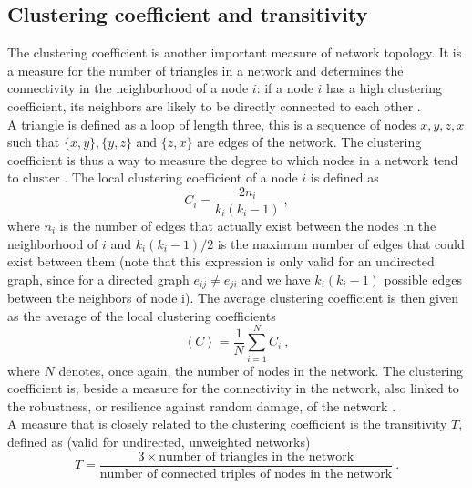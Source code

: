 \documentclass[11 pt , letterpaper , twoside , openright]{book}
\begin{document}
\subsection{Clustering coefficient and transitivity}

The clustering coefficient is another important measure of network topology. It is a measure for the number of triangles in a network and determines the connectivity in the neighborhood of a node $i$: if a node $i$ has a high clustering coefficient, its neighbors are likely to be directly connected to each other \cite{Li2017}. \\
\newline
A triangle is defined as a loop of length three, this is a sequence of nodes $x, y, z, x$ such that $\{x, y\}, \{y, z\}$ and $\{z, x\}$ are edges of the network. The clustering coefficient is thus a way to measure the degree to which nodes in a network tend to cluster \cite{Li2017}. The local clustering coefficient of a node $i$ is defined as
\begin{equation}\label{clus}
	C_i = \frac{2n_i}{k_i(k_i-1)} \ ,
\end{equation}
where $n_i$ is the number of edges that actually exist between the nodes in the neighborhood of $i$ and $k_i(k_i-1)/2$ is the maximum number of edges that could exist between them (note that this expression is only valid for an undirected graph, since for a directed graph $e_{ij} \neq e_{ji}$ and we have $k_i(k_i-1)$ possible edges between the neighbors of node i). %
The average clustering coefficient is then given as the average of the local clustering coefficients
\begin{equation}\label{avClus}
	\left<C\right> = \frac{1}{N}\sum_{i = 1}^N C_i \ ,
\end{equation}
where $N$ denotes, once again, the number of nodes in the network. The clustering coefficient is, beside a measure for the connectivity in the network, also linked to the robustness, or resilience against random damage,  of the network \cite{Heer2020}\cite{Iyer2013} \cite{Li2017}. \\
\newline
A measure that is closely related to the clustering coefficient is the transitivity $T$, defined as (valid for undirected, unweighted networks) \cite{F.Costa2007}
\begin{equation}\label{globalTrans}
	T = \frac{3 \times \text{number of triangles in the network}}{\text{number of connected triples of nodes in the network}} \ .
\end{equation}
\end{document}
